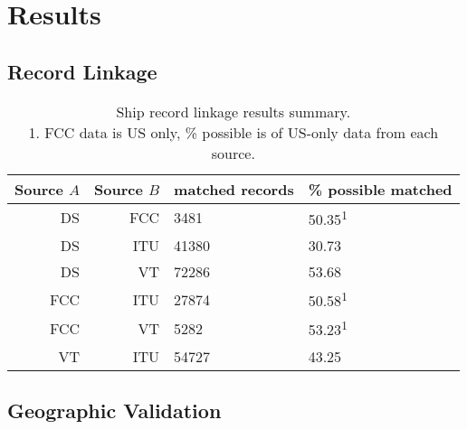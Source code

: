 \section{\textbf{Results}}



\subsection{Record Linkage}

\begin{table}[htbp]
  \begin{tabular}{rrll} %
    \hline
    Source $A$ & Source $B$ & matched records & \% possible matched \\
    \hline
     DS & FCC &  3481 & 50.35\textsuperscript{1} \\
     DS & ITU & 41380 & 30.73 \\
     DS &  VT & 72286 & 53.68 \\
    FCC & ITU & 27874 & 50.58\textsuperscript{1} \\
    FCC &  VT &  5282 & 53.23\textsuperscript{1} \\
     VT & ITU & 54727 & 43.25 \\
  \end{tabular}
  \caption{Ship record linkage results summary. \\
    1. FCC data is US only, \% possible is of US-only data from each source.}
  \label{table:ships-record-linkage-results-summary}
\end{table}


\subsection{Geographic Validation}


